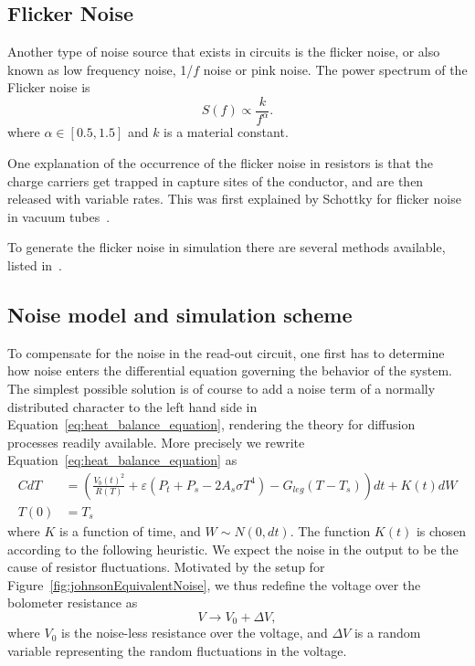 \subsection{Flicker Noise}

Another type of noise source that exists in circuits is the flicker
noise, or also known as low frequency noise, 1/$f$ noise or pink noise. The power
spectrum of the Flicker noise is
\begin{equation}
  \label{eq:power_spectrum_flicker_noise}
  S(f) \propto \frac{k}{f^{\alpha}}.
\end{equation}
where $\alpha \in [0.5, 1.5]$ and $k$ is a material constant.

One explanation of the occurrence of the flicker noise in resistors is
that the charge carriers get trapped in capture sites of the
conductor, and are then released with variable rates. This was first
explained by Schottky for flicker noise in vacuum tubes~\cite{PhysRev.28.74}.


To generate the flicker noise in simulation there are several methods
available, listed in~\cite{381848}.

\subsection{Noise model and simulation scheme}

To compensate for the noise in the read-out circuit, one first has to
determine how noise enters the differential equation governing the
behavior of the system. The simplest possible solution is of course to
add a noise term of a normally distributed character to the left hand side
in Equation~\eqref{eq:heat_balance_equation}, rendering the theory for
diffusion processes readily available. More precisely we rewrite Equation~\eqref{eq:heat_balance_equation}
as
\begin{align} \label{eq:heat_balance_equation_noise1}
 CdT&=(\frac{V_b(t)^2}{R(T)}+\varepsilon(P_t+P_s -2A_s \sigma T^4)-G_{leg}(T-T_s))dt + K(t)dW \\
 T(0)&=T_s	\nonumber
\end{align}
where $K$ is a function of time, and $W \sim N(0, dt)$.
The function $K(t)$ is chosen according to the following heuristic.
We expect the noise in the output to be the cause of resistor fluctuations.
Motivated by the setup for Figure~\ref{fig:johnsonEquivalentNoise}, we thus redefine the voltage over
the bolometer resistance as
\begin{equation}
  \label{eq:randomvariable_transformation}
  V \rightarrow V_0 + \Delta V,
\end{equation}
where $V_0$ is the noise-less resistance over the voltage, and $\Delta
V$ is a random variable representing the random fluctuations in the
voltage.

